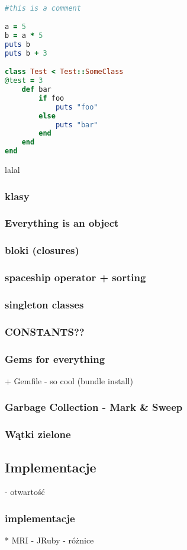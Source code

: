 \begin{frame}[fragile]
\begin{lstlisting}[language=Ruby]

#this is a comment

a = 5
b = a * 5
puts b
puts b + 3

class Test < Test::SomeClass
@test = 3
    def bar
        if foo
            puts "foo"
        else
            puts "bar"
        end
    end
end
\end{lstlisting}
lalal
\end{frame}

\begin{frame}[fragile]
\frametitle{klasy}
\end{frame}
\begin{frame}[fragile]
\frametitle{Everything is an object}
\end{frame}
\begin{frame}[fragile]
\frametitle{bloki (closures)}
\end{frame}
\begin{frame}[fragile]
\frametitle{spaceship operator + sorting}
\end{frame}
\begin{frame}[fragile]
\frametitle{singleton classes}
\end{frame}
\begin{frame}[fragile]
\frametitle{CONSTANTS??}
\end{frame}
\begin{frame}[fragile]
\frametitle{Gems for everything}
 + Gemfile - so cool (bundle install)
\end{frame}
\begin{frame}[fragile]
\frametitle{Garbage Collection - Mark \& Sweep}
\end{frame}

\begin{frame}[fragile]
\frametitle{Wątki zielone}
\end{frame}
\subsection{Implementacje}
 - otwartość

\begin{frame}[fragile]
\frametitle{implementacje}
    * MRI
    - JRuby - różnice
\end{frame}
